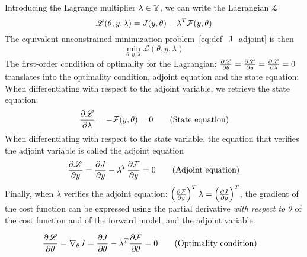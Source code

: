 \documentclass[../../Main_ManuscritThese.tex]{subfiles}
\begin{document}
Introducing the Lagrange multiplier  $\lambda \in \mathbb{Y}$, we can write the Lagrangian $\mathscr{L}$
\begin{equation}
  \mathscr{L}(\theta, y, \lambda) = J(y,\theta) - \lambda^T \mathcal{F}(y, \theta)
\end{equation}
The equivalent unconstrained minimization problem~\cref{eq:def_J_adjoint} is then
\begin{equation}
  \min_{\theta,y,\lambda} \mathscr{L}(\theta,y,\lambda)
\end{equation}
The first-order condition of optimality for the Lagrangian: $\frac{\partial \mathscr{L}}{\partial \theta} = \frac{\partial \mathscr{L}}{\partial y} = \frac{\partial \mathscr{L}}{\partial \lambda} = 0$ translates into the optimality condition, adjoint equation and the state equation:
When differentiating with respect to the adjoint variable, we retrieve the state equation:
\begin{equation}
  \frac{\partial \mathscr{L}}{\partial \lambda} = - \mathcal{F}(y,\theta) = 0 \tag{State equation}
\end{equation}
When differentiating with respect to the state variable, the equation that verifies the adjoint variable is called the adjoint equation
\begin{equation}
  \frac{\partial \mathscr{L}}{\partial y} = \frac{\partial J}{\partial y} - \lambda^T \frac{\partial \mathcal{F}}{\partial y}= 0  \tag{Adjoint equation}
\end{equation}
Finally, when $\lambda$ verifies the adjoint equation: $ \left(\frac{\partial \mathcal{F}}{\partial y}\right)^T\lambda= \left(\frac{\partial J}{\partial y}\right)^T$, the gradient of the cost function can be expressed using the partial derivative \emph{with respect to $\theta$} of the cost function and of the forward model, and the adjoint variable.

\begin{align}
    \pfrac{\mathscr{L}}{\theta} = \nabla_\theta J %
                               &= \pfrac{J}{\theta} - \innerprod{\lambda}{\pfrac{\mathcal{F}}{\theta}} = 0 \tag{Optimality condition}
\end{align}
\end{document}
